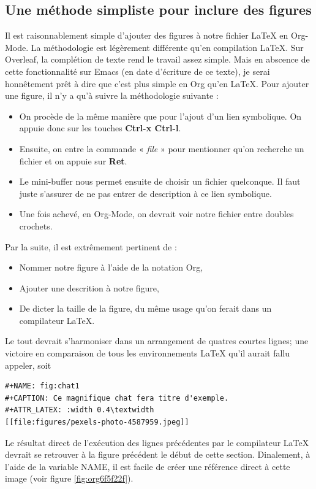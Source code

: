 \documentclass[8pt]{article}
\numberwithin{equation}{section}
\begin{document}
\subsection{Une méthode simpliste pour inclure des figures}
\label{sec:org16ff508}
Il est raisonnablement simple d'ajouter des figures à notre fichier \LaTeX{} en Org-Mode.
La méthodologie est légèrement différente qu'en compilation \LaTeX{}.
Sur Overleaf, la complétion de texte rend le travail assez simple.
Mais en abscence de cette fonctionnalité sur Emacs (en date d'écriture de ce texte), je serai honnêtement prêt à dire que c'est plus simple en Org qu'en \LaTeX{}.
Pour ajouter une figure, il n'y a qu'à suivre la méthodologie suivante : 
\begin{itemize}
\item On procède de la même manière que pour l'ajout d'un lien symbolique. On appuie donc sur les touches \textbf{Ctrl-x Ctrl-l}.
\item Ensuite, on entre la commande « \emph{file} » pour mentionner qu'on recherche un fichier et on appuie sur \textbf{Ret}.
\item Le mini-buffer nous permet ensuite de choisir un fichier quelconque. Il faut juste s'assurer de ne pas entrer de description à ce lien symbolique.
\item Une fois achevé, en Org-Mode, on devrait voir notre fichier entre doubles crochets.
\end{itemize}

Par la suite, il est extrêmement pertinent de : 
\begin{itemize}
\item Nommer notre figure à l'aide de la notation Org,
\item Ajouter une descrition à notre figure,
\item De dicter la taille de la figure, du même usage qu'on ferait dans un compilateur \LaTeX{}.
\end{itemize}
Le tout devrait s'harmoniser dans un arrangement de quatres courtes lignes; une victoire en comparaison de tous les environnements \LaTeX{} qu'il aurait fallu appeler, soit

\begin{verbatim}
#+NAME: fig:chat1
#+CAPTION: Ce magnifique chat fera titre d'exemple.
#+ATTR_LATEX: :width 0.4\textwidth
[[file:figures/pexels-photo-4587959.jpeg]]
\end{verbatim}

Le résultat direct de l'exécution des lignes précédentes par le compilateur \LaTeX{} devrait se retrouver à la figure précédent le début de cette section. 
Dinalement, à l'aide de la variable NAME, il est facile de créer une référence direct à cette image (voir figure \ref{fig:org6f5f22f}).
\end{document}
